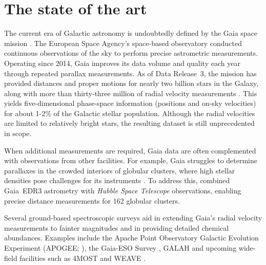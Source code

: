 \section{The state of the art}
    The current era of Galactic astronomy is undoubtedly defined by the Gaia space mission \citep{2016A&A...595A...1G,2016A&A...595A...2G,2018A&A...616A...1G,2021A&A...650C...3G,2023A&A...674A...1G}. The European Space Agency's space-based observatory conducted continuous observations of the sky to perform precise astrometric measurements. Operating since 2014, Gaia improves its data volume and quality each year through repeated parallax measurements.  As of Data Release~3, the mission has provided distances and proper motions for nearly two billion stars in the Galaxy, along with more than thirty-three million of radial velocity measurements \citep{2023A&A...674A...1G}. This yields five-dimensional phase-space information (positions and on-sky velocities) for about 1-2\% of the Galactic stellar population. Although the radial velocities are limited to relatively bright stars, the resulting dataset is still unprecedented in scope.

    When additional measurements are required, Gaia data are often complemented with observations from other facilities.  For example, Gaia struggles to determine parallaxes in the crowded interiors of globular clusters, where high stellar densities pose challenges for its instruments \citep{2017MNRAS.467..412P}. To address this, \citet{2021MNRAS.505.5957B} combined Gaia~EDR3 astrometry with \emph{Hubble Space Telescope} observations, enabling precise distance measurements for 162 globular clusters.

    Several ground-based spectroscopic surveys aid in extending Gaia's radial velocity measurements to fainter magnitudes and in providing detailed chemical abundances. Examples include the Apache Point Observatory Galactic Evolution Experiment (APOGEE; \citep{2017AJ....154...94M}), the Gaia-ESO Survey \citep{2022A&A...666A.120G}, GALAH \citep{2012ASPC..458..421Z} and upcoming wide-field facilities such as 4MOST \citep{2019Msngr.175....3D} and WEAVE \citep{2014SPIE.9147E..0LD}.

